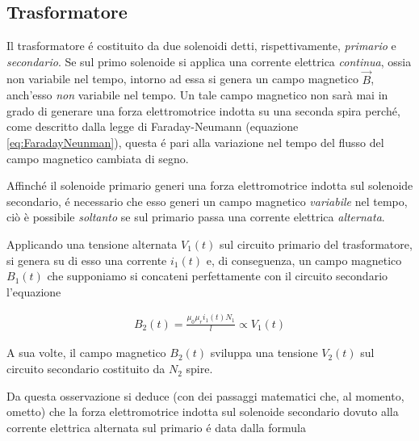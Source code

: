 \documentclass[17pt]{extarticle}
\begin{document}
\begin{enumerate}
\section{Trasformatore}

Il trasformatore \'e costituito da due solenoidi detti, rispettivamente, \emph{primario} e \emph{secondario}. Se sul primo solenoide si applica una corrente elettrica \emph{continua}, ossia non variabile nel tempo, intorno ad essa si genera un campo magnetico $\vec{B}$, anch'esso \emph{non} variabile nel tempo. Un tale campo magnetico non sarà mai in grado di generare una forza elettromotrice indotta su una seconda spira perch\'e, come descritto dalla legge di Faraday-Neumann (equazione \ref{eq:FaradayNeunman}), questa \'e pari alla variazione nel tempo del flusso del campo magnetico cambiata di segno.

Affinch\'e il solenoide primario generi una forza elettromotrice indotta sul solenoide secondario, \'e necessario che esso generi un campo magnetico \emph{variabile} nel tempo, ciò è possibile \emph{soltanto} se sul primario passa una corrente elettrica \emph{alternata}. 




Applicando una tensione alternata $V_1(t)$ sul circuito primario del trasformatore, si genera su di esso una corrente $i_1(t)$ e, di conseguenza, un campo magnetico $B_1(t)$ che supponiamo si concateni perfettamente con il circuito secondario l'equazione

\begin{eqnarray}
	B_2(t) = \frac{\mu_0\mu_r i_1(t)N_1}{l}\propto V_1(t)
\end{eqnarray}

A sua volte, il campo magnetico $B_2(t)$ sviluppa una tensione $V_2(t)$ sul circuito secondario costituito da $N_2$ spire.

Da questa osservazione si deduce (con dei passaggi matematici che, al momento, ometto) che la forza elettromotrice indotta sul solenoide secondario dovuto alla corrente elettrica alternata sul primario \'e data dalla formula


\end{enumerate}
\end{document}
